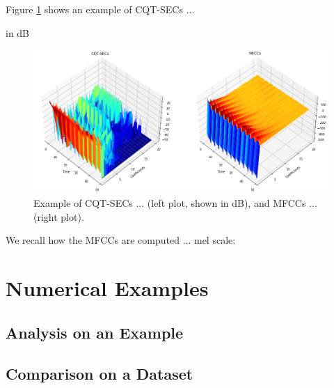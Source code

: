 \documentclass[journal]{IEEEtran}
\begin{document}
Figure \ref{fig:extraction} shows an example of CQT-SECs ...

in dB

\begin{figure}[htp]
    \centering
    \includegraphics[width=\textwidth]{extraction.png}
    \caption{Example of CQT-SECs ... (left plot, shown in dB), and MFCCs ... (right plot).}
    \label{fig:extraction}
\end{figure}

We recall how the MFCCs are computed ...\cite{mermelstein1976}
mel scale: \cite{stevens1937}



\section{Numerical Examples} %

\subsection{Analysis on an Example}



\subsection{Comparison on a Dataset}



\end{document}
